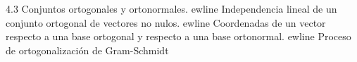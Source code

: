 \documentclass[preview]{standalone}
\begin{document}
\begin{center}
4.3 Conjuntos ortogonales y ortonormales. 
ewline  Independencia lineal de un conjunto ortogonal de vectores no nulos. 
ewline Coordenadas de un vector respecto a una base ortogonal y respecto a una base ortonormal. 
ewline Proceso de ortogonalización de Gram-Schmidt
\end{center}
\end{document}
